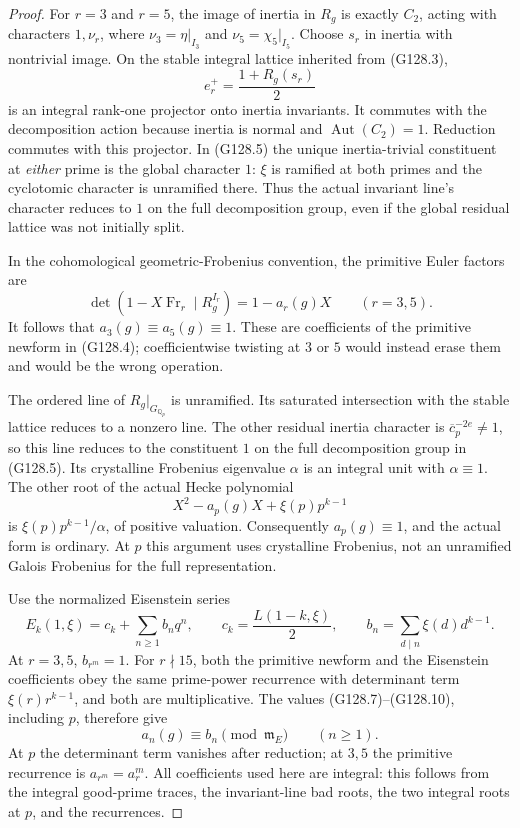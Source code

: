 \begin{proof}
For \(r=3\) and \(r=5\), the image of inertia in \(R_g\) is
exactly \(C_2\), acting with characters \(1,\nu_r\), where
\(\nu_3=\eta|_{I_3}\) and \(\nu_5=\chi_5|_{I_5}\).
Choose \(s_r\) in inertia with nontrivial image.  On the stable
integral lattice inherited from (G128.3),
\[
                         e_r^+=\frac{1+R_g(s_r)}2
 \tag{G128.8}
\]
is an integral rank-one projector onto inertia invariants.
It commutes with the decomposition action because inertia is
normal and \(\operatorname{Aut}(C_2)=1\).
Reduction commutes with this projector.  In (G128.5) the
unique inertia-trivial constituent at \emph{either} prime is
the global character \(1\): \(\xi\) is ramified at both
primes and the cyclotomic character is unramified there.
Thus the actual invariant line's character reduces to \(1\)
on the full decomposition group, even if the global residual
lattice was not initially split.

In the cohomological geometric-Frobenius convention, the
primitive Euler factors are
\[
 \det(1-X\operatorname{Fr}_r\mid R_g^{I_r})
                        =1-a_r(g)X\qquad(r=3,5).
 \tag{G128.9}
\]
It follows that \(a_3(g)\equiv a_5(g)\equiv1\).
These are coefficients of the primitive newform in (G128.4);
coefficientwise twisting at \(3\) or \(5\) would instead erase
them and would be the wrong operation.

The ordered line of \(R_g|_{G_{\mathbb Q_p}}\) is unramified.
Its saturated intersection with the stable lattice reduces to
a nonzero line.  The other residual inertia character is
\(\overline c_p^{-2e}\ne1\), so this line reduces to the
constituent \(1\) on the full decomposition group in (G128.5).
Its crystalline Frobenius eigenvalue \(\alpha\) is an integral
unit with \(\alpha\equiv1\).  The other root of the actual
Hecke polynomial
\[
                    X^2-a_p(g)X+\xi(p)p^{k-1}
 \tag{G128.10}
\]
is \(\xi(p)p^{k-1}/\alpha\), of positive valuation.
Consequently \(a_p(g)\equiv1\), and the actual form is ordinary.
At \(p\) this argument uses crystalline Frobenius, not an
unramified Galois Frobenius for the full representation.

Use the normalized Eisenstein series
\[
 E_k(1,\xi)=c_k+\sum_{n\ge1}b_nq^n,\qquad
 c_k=\frac{L(1-k,\xi)}2,\qquad
 b_n=\sum_{d\mid n}\xi(d)d^{k-1}.
 \tag{G128.11}
\]
At \(r=3,5\), \(b_{r^m}=1\).
For \(r\nmid15\), both the primitive newform and the
Eisenstein coefficients obey the same prime-power recurrence
with determinant term \(\xi(r)r^{k-1}\), and both are
multiplicative.  The values (G128.7)--(G128.10), including
\(p\), therefore give
\[
                         a_n(g)\equiv b_n\pmod{\mathfrak m_E}
                              \qquad(n\ge1).
 \tag{G128.12}
\]
At \(p\) the determinant term vanishes after reduction; at
\(3,5\) the primitive recurrence is \(a_{r^m}=a_r^m\).
All coefficients used here are integral: this follows from
the integral good-prime traces, the invariant-line bad roots,
the two integral roots at \(p\), and the recurrences.


\end{proof}
